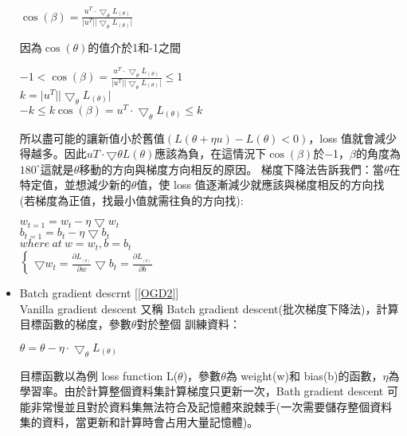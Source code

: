 \begin{itemize}
\begin{center}
$\cos(\beta)=\frac{u^{T}\cdot\bigtriangledown_{\theta} L_{(\theta)}}{\vert u^{T}\vert\vert \bigtriangledown_{\theta} L_{(\theta)}\vert}$\\
\end{center}
因為$\cos(\theta)$的值介於1和-1之間\\
\begin{center}
$-1<\cos(\beta)=\frac{u^{T}\cdot\bigtriangledown_{\theta} L_{(\theta)}}{\vert u^{T}\vert\vert \bigtriangledown_{\theta} L_{(\theta)}\vert}\leq 1$\\
$k=\vert u^{T}\vert\vert \bigtriangledown_{\theta} L_{(\theta)}\vert$\\
$-k \leq k\cos(\beta)=u^{T}\cdot\bigtriangledown_{\theta} L_{(\theta)}\leq k$
\end{center}
\newpage
 所以盡可能的讓新值小於舊值$(L(\theta+\eta u) − L(\theta) < 0)$，loss 值就會減少得越多。因此$u T \cdot \bigtriangledown\theta L(\theta)$應該為負，在這情況下$\cos(\beta)$於−1，$\beta$的角度為 $180^{\circ}$這就是$\theta$移動的方向與梯度方向相反的原因。 梯度下降法告訴我們：當$\theta$在特定值，並想減少新的$\theta$值，使 loss 值逐漸減少就應該與梯度相反的方向找 (若梯度為正值，找最小值就需往負的方向找):
\begin{center}
$w_{t=1}=w_t-\eta\bigtriangledown w_t$\\
$b_{t=1}=b_t-\eta\bigtriangledown b_t$\\
$where\ at\ w=w_t,b=b_t$\\
$\begin{cases}
 \bigtriangledown w_t=\frac{\partial L_{_{(\theta)}}}{\partial w}
 \bigtriangledown b_t=\frac{\partial L_{_{(\theta)}}}{\partial b}
 \end{cases}$
\end{center}
\item Batch gradient descrnt [\ref{OGD2}]\\
 Vanilla gradient descent 又稱 Batch gradient descent(批次梯度下降法)，計算目標函數的梯度，參數$\theta$對於整個 訓練資料：
\begin{center}
$\theta=\theta-\eta\cdot\bigtriangledown_{\theta}L_{(\theta)}$
\end{center}
 目標函數以為例 loss function L($\theta$)，參數$\theta$為 weight(w)和 bias(b)的函數，$\eta$為學習率。由於計算整個資料集計算梯度只更新一次，Bath gradient descent 可能非常慢並且對於資料集無法符合及記憶體來說棘手(一次需要儲存整個資料集的資料，當更新和計算時會占用大量記憶體)。\\
\begin{lstlisting}[caption=\Large Batch gradient descrnt]

\end{lstlisting}
\end{itemize}
